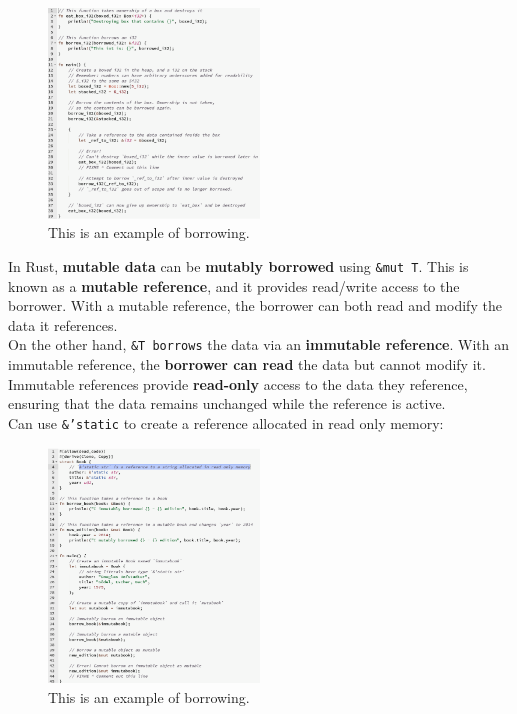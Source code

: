 \documentclass{article}
\begin{document}
\begin{figure}[h]
  \centering
  \includegraphics[width=0.5\textwidth]{images/borrowing.png} 
  \caption{This is an example of borrowing.}
  \label{fig:borrowing_example}
\end{figure}
In Rust, \textbf{mutable data} can be \textbf{mutably borrowed} using \texttt{\&mut T}. This is known as a \textbf{mutable reference}, and it provides read/write access to the borrower. With a mutable reference, the borrower can both read and modify the data it references.\\
On the other hand, \texttt{\&T borrows} the data via an \textbf{immutable reference}. With an immutable reference, the \textbf{borrower can read} the data but cannot modify it. Immutable references provide \textbf{read-only} access to the data they reference, ensuring that the data remains unchanged while the reference is active.\\
Can use \texttt{\&'static} to create a reference allocated in read only memory:
\\
\begin{figure}[h]
  \centering
  \includegraphics[width=0.5\textwidth]{images/mutable_reference.png} 
  \caption{This is an example of borrowing.}
  \label{fig:mutable_reference_example}
\end{figure}
\\
\end{document}
